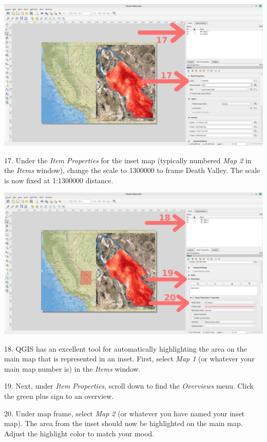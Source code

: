 \documentclass[oneside,a4paper,11pt,explicit]{book}
\begin{document}
\vspace{.25em}

\centerline{\includegraphics[width=\textwidth]{AddInset.png}}

17. Under the \textit{Item Properties} for the inset map (typically numbered \textit{Map 2} in the \textit{Items} window), change the scale to 1300000 to frame Death Valley. The scale is now fixed at 1:1300000 distance.

\vspace{.25em}

\centerline{\includegraphics[width=\textwidth]{RegionShade.png}}

18. QGIS has an excellent tool for automatically highlighting the area on the main map that is represented in an inset. First, select \textit{Map 1} (or whatever your main map number is) in the \textit{Items} window.
 
19. Next, under \textit{Item Properties}, scroll down to find the \textit{Overviews} menu. Click the green plus sign to an overview.

20. Under map frame, select \textit{Map 2} (or whatever you have named your inset map). The area from the inset should now be highlighted on the main map. Adjust the highlight color to match your mood.
\end{document}
